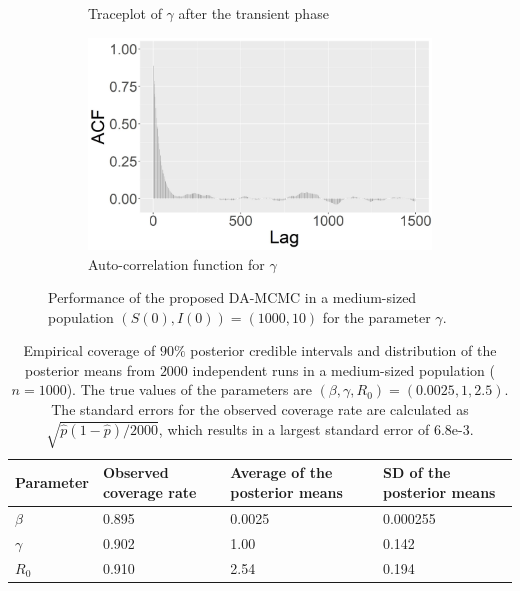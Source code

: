 \documentclass[11pt]{article}
\begin{document}
\begin{figure}
\begin{subfigure}[b]{0.24\textwidth}
			\caption{Traceplot of $\gamma$ after the transient phase}
			\label{fig:E1_burn_gamma_tp}
		\end{subfigure}
		\hfill
		\begin{subfigure}[b]{0.24\textwidth}
			\centering
			\includegraphics[width=\textwidth]{E1_burn_gamma_acf}
			\caption{Auto-correlation function for $\gamma$}
			\label{fig:E1_burn_gamma_acf}
		\end{subfigure}
		\caption{Performance of the proposed DA-MCMC in a medium-sized population $(S(0), I(0)) = (1000, 10)$ for the parameter $\gamma$.}
		\label{fig:E1}
	\end{figure}
	
    \begin{table}
    \centering
    \begin{tabular}{ C{2cm}| *{3}{C{3cm}}}
        Parameter & Observed coverage rate & Average of the posterior means & SD of the posterior means \\ 
        \hline
        $\beta$ & 0.895 & 0.0025 & 0.000255 \\ 
        $\gamma$ & 0.902 & 1.00 & 0.142 \\ 
        $R_0$ & 0.910 & 2.54 & 0.194 \\
        \hline
    \end{tabular}
    \caption{Empirical coverage of $90\%$ posterior credible intervals and distribution of the posterior means from $2000$ independent runs in a medium-sized population ($n=1000$). The true values of the parameters are $(\beta, \gamma, R_0) = (0.0025, 1, 2.5)$. The standard errors for the observed coverage rate are calculated as $\sqrt{\hat{p}(1-\hat{p})/2000}$, which results in a largest standard error of $6.8$e-3.}
    \label{tab:coverage}
    \end{table}
	
\end{document}
